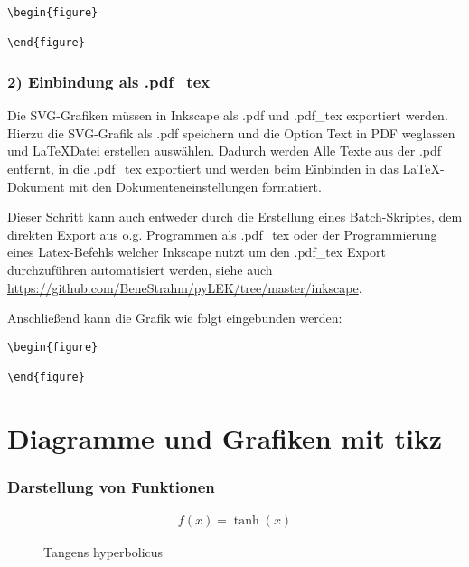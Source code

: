 \begin{Verbatim}
\begin{figure}
    
\end{figure}
\end{Verbatim}

\newpage

\subsubsection{2) Einbindung als .pdf\_tex}

Die SVG-Grafiken müssen in Inkscape als .pdf und .pdf\_tex exportiert werden. Hierzu die SVG-Grafik als .pdf speichern und die Option \flqq Text in PDF weglassen und \LaTeX Datei erstellen \frqq auswählen. Dadurch werden Alle Texte aus der .pdf entfernt, in die .pdf\_tex exportiert und werden beim Einbinden in das \LaTeX-Dokument mit den Dokumenteneinstellungen formatiert.

Dieser Schritt kann auch entweder durch die Erstellung eines Batch-Skriptes, dem direkten Export aus o.g. Programmen als .pdf\_tex oder der Programmierung eines Latex-Befehls welcher Inkscape nutzt um den .pdf\_tex Export durchzuführen automatisiert werden, siehe auch \url{https://github.com/BeneStrahm/pyLEK/tree/master/inkscape}.

Anschließend kann die Grafik wie folgt eingebunden werden:

\begin{Verbatim}
\begin{figure}
    
\end{figure}
\end{Verbatim}

\newpage

\section{Diagramme und Grafiken mit tikz}
\label{subsec:tikz}

\subsubsection{Darstellung von Funktionen}

\begin{figure}[htb]
\centering
\begin{align*}
f(x)=\tanh(x)
\end{align*}
\caption[Tangens hyperbolicus Aktivierungsfunktion]{Tangens hyperbolicus}
\label{fig:05_AktivTan}
\end{figure}

